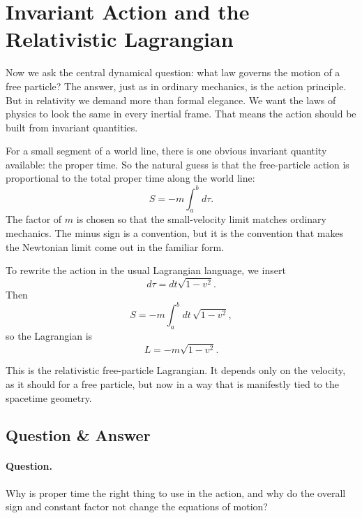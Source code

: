 \section{Invariant Action and the Relativistic Lagrangian}

Now we ask the central dynamical question: what law governs the motion of a free particle? The answer, just as in ordinary mechanics, is the action principle. But in relativity we demand more than formal elegance. We want the laws of physics to look the same in every inertial frame. That means the action should be built from invariant quantities.

For a small segment of a world line, there is one obvious invariant quantity available: the proper time. So the natural guess is that the free-particle action is proportional to the total proper time along the world line:
\begin{equation}
S=-m\int_a^b d\tau.
\end{equation}
The factor of \(m\) is chosen so that the small-velocity limit matches ordinary mechanics. The minus sign is a convention, but it is the convention that makes the Newtonian limit come out in the familiar form.

To rewrite the action in the usual Lagrangian language, we insert
\begin{equation}
d\tau = dt\sqrt{1-v^2}.
\end{equation}
Then
\begin{equation}
S=-m\int_a^b dt\,\sqrt{1-v^2},
\end{equation}
so the Lagrangian is
\begin{equation}
L=-m\sqrt{1-v^2}.
\end{equation}

This is the relativistic free-particle Lagrangian. It depends only on the velocity, as it should for a free particle, but now in a way that is manifestly tied to the spacetime geometry.

\subsection{Question \& Answer}

\paragraph{Question.}
Why is proper time the right thing to use in the action, and why do the overall sign and constant factor not change the equations of motion?


